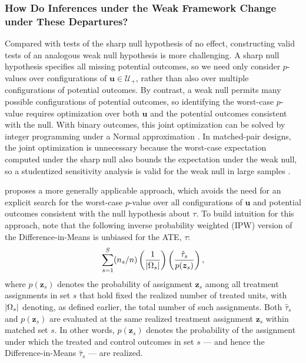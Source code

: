 \documentclass[twoside,11pt]{article}
\DeclarePairedDelimiter\abs{\lvert}{\rvert}
\begin{document}
\subsubsection{How Do Inferences under the Weak Framework Change under
These
Departures?}\label{how-do-inferences-under-the-weak-framework-change-under-these-departures}

Compared with tests of the sharp null hypothesis of no effect,
constructing valid tests of an analogous weak null hypothesis is more
challenging. A sharp null hypothesis specifies all missing potential
outcomes, so we need only consider \(p\)-values over configurations of
\(\bm{u} \in \mathcal{U}_{+}\), rather than also over multiple
configurations of potential outcomes. By contrast, a weak null permits
many possible configurations of potential outcomes, so identifying the
worst-case \(p\)-value requires optimization over both \(\bm{u}\) and
the potential outcomes consistent with the null. With binary outcomes,
this joint optimization can be solved by integer programming under a
Normal approximation \citep{fogartyetal2017}. In matched-pair designs, the joint
optimization is unnecessary because the worst-case expectation computed under the
sharp null also bounds the expectation under the weak null, so a
studentized sensitivity analysis is valid for the weak null in large
samples \citep{fogarty2020}.

\citet{fogarty2023} proposes a more generally applicable approach,
which avoids the need for an explicit search for the worst-case
\(p\)-value over all configurations of \(\bm{u}\) and potential outcomes
consistent with the null hypothesis about \(\tau\). To build intuition
for this approach, note that the following inverse probability weighted
(IPW) version of the Difference-in-Means is unbiased for the ATE,
\(\tau\): \begin{align} \label{eq: weighted diff-in-means}
\sum \limits_{s = 1}^S (n_s/n) \left(\frac{1}{\abs{\Omega_s}}\right)\left(\frac{\hat{\tau}_s}{p(\bm{z}_s)}\right),
\end{align} where \(p(\bm{z}_s)\) denotes the probability of assignment
\(\bm{z}_s\) among all treatment assignments in set \(s\) that hold
fixed the realized number of treated units, with \(\abs{\Omega_s}\)
denoting, as defined earlier, the total number of such assignments. Both
\(\hat{\tau}_s\) and \(p(\bm{z}_s)\) are evaluated at the same realized
treatment assignment \(\bm{z}_s\) within matched set \(s\). In other
words, \(p(\bm{z}_s)\) denotes the probability of the assignment under
which the treated and control outcomes in set \(s\) --- and hence the
Difference-in-Means \(\hat{\tau}_s\) --- are realized.
\end{document}

